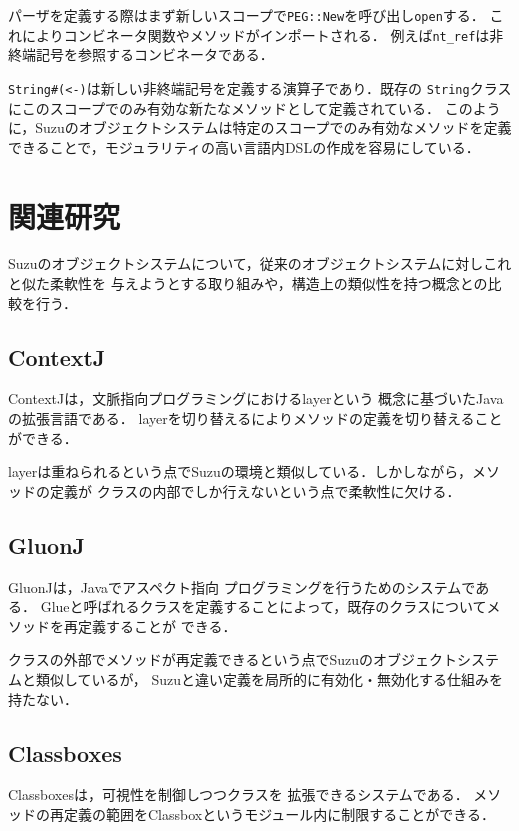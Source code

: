 \documentclass{ipsjprosym}
\begin{document}
パーザを定義する際はまず新しいスコープで\verb|PEG::New|を呼び出し\verb|open|する．
これによりコンビネータ関数やメソッドがインポートされる．
例えば\verb|nt_ref|は非終端記号を参照するコンビネータである．

\verb|String#(<-)|は新しい非終端記号を定義する演算子であり．既存の
\verb|String|クラスにこのスコープでのみ有効な新たなメソッドとして定義されている．
このように，Suzuのオブジェクトシステムは特定のスコープでのみ有効なメソッドを定義
できることで，モジュラリティの高い言語内DSLの作成を容易にしている．

\section{関連研究}

Suzuのオブジェクトシステムについて，従来のオブジェクトシステムに対しこれと似た柔軟性を
与えようとする取り組みや，構造上の類似性を持つ概念との比較を行う．

\subsection{ContextJ}

ContextJ\cite{AppeltauerMalte:2011}は，文脈指向プログラミングにおけるlayerという
概念に基づいたJavaの拡張言語である．
layerを切り替えるによりメソッドの定義を切り替えることができる．

layerは重ねられるという点でSuzuの環境と類似している．しかしながら，メソッドの定義が
クラスの内部でしか行えないという点で柔軟性に欠ける．

\subsection{GluonJ}

GluonJ\cite{Chiba:2010:MMC:1869459.1869503}は，Javaでアスペクト指向
プログラミングを行うためのシステムである．
Glueと呼ばれるクラスを定義することによって，既存のクラスについてメソッドを再定義することが
できる．

クラスの外部でメソッドが再定義できるという点でSuzuのオブジェクトシステムと類似しているが，
Suzuと違い定義を局所的に有効化・無効化する仕組みを持たない．

\subsection{Classboxes}

Classboxes\cite{Bergel:2005:CCV:1646591.1646599}は，可視性を制御しつつクラスを
拡張できるシステムである．
メソッドの再定義の範囲をClassboxというモジュール内に制限することができる．
\end{document}
